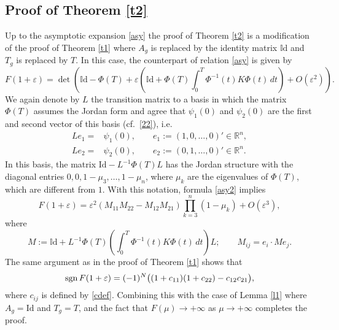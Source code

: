 \documentclass{article}
\let\epsilon\varepsilon
\let\varepsilon\epsilon
\begin{document}
\subsection{Proof of Theorem \ref{t2}}
Up to the asymptotic expansion \eqref{asy} the proof of Theorem \ref{t2} is a modification of the proof of Theorem \ref{t1}  where $A_g$ is replaced by the identity matrix $\mathbb{I}\text{d}$ and $T_g$ is replaced by $T$. In this case, the counterpart of relation \eqref{asy} is given by
\begin{equation}\label{asy2}
F(1+\epsilon)
=
\det\left(  \mathbb{I}\text{d}-\Phi(T) +\varepsilon \left(\mathbb{I}\text{d} +\Phi(T) \int_{0}^{T}  \Phi^{-1}(t)K \Phi(t)\,dt\right)+O(\varepsilon^2)\right).
\end{equation}
We again denote by $L$ the transition matrix to a basis
in which the matrix $\Phi(T)$ assumes the Jordan form
and agree that $\psi_1(0)$ and $\psi_2(0)$ are the first and second  vector of this basis (cf.~\eqref{22}), i.e.
\begin{align*}\label{ps}
L e_1=&\psi_1(0),\qquad e_1:=(1,0,\ldots,0)'\in\mathbb{R}^n,\\
L e_2=&\psi_2(0),\qquad e_2:=(0,1,\ldots,0)'\in\mathbb{R}^n.
\end{align*}
In this basis, the matrix $\text{Id}-L^{-1}\Phi(T)L$ has the Jordan structure 
with the diagonal entries $0, 0 ,1-\mu_3,\ldots,1-\mu_n$, where $\mu_k$ are the eigenvalues of $\Phi(T)$, which are different from $1$.
With this notation, formula \eqref{asy2} implies 
\begin{equation}\label{FF}
F(1+\epsilon)=\varepsilon ^2 (M_{11}M_{22}-M_{12}M_{21}) \prod^{n}_{k=3}(1-\mu_k)+O(\varepsilon^3),
\end{equation}
where
\begin{equation}\label{M}
M:=\mathbb{I}\text{d} + L^{-1} \Phi(T) \left(\int_{0}^{T}  \Phi^{-1}(t)K \Phi(t)\,dt\right)L; \qquad M_{ij}=e_i \cdot Me_j. %
\end{equation}
The same argument as in the proof of Theorem \ref{t1} shows that 
\[
{\rm sgn}\, F(1+\epsilon)=(-1)^N \bigl( (1+c_{11})(1+c_{22})-c_{12}c_{21}\bigr),
\]
where $c_{ij}$ is defined by \eqref{cdef}. Combining this with the case of Lemma \ref{l1} where $A_g = \text{Id}$ and $T_g=T$, and the fact that $F(\mu)\to+\infty$  as $\mu\to+\infty$ completes the proof.
\end{document}
